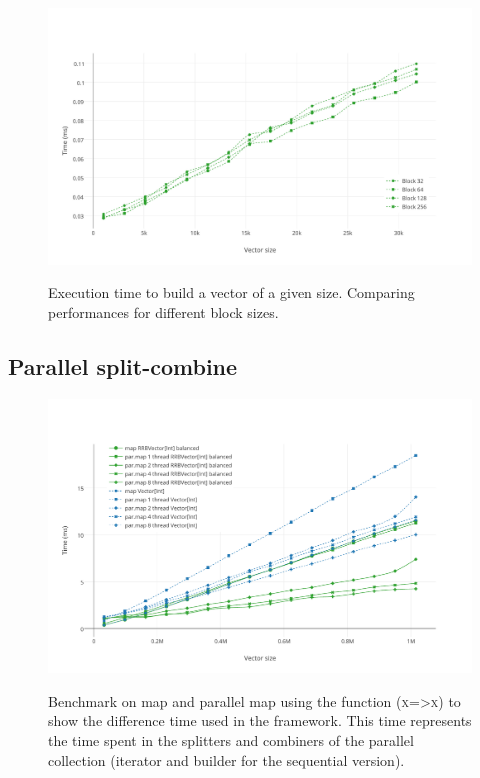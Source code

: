 \begin{figure}[h!]
  \centering
  \includegraphics[width=\textwidth]{Benchmarks/Builder_blocks.pdf}
  \label{BuilderBlocksBenchmarks}
  \caption{Execution time to build a vector of a given size. Comparing performances for different block sizes.}
\end{figure}

\subsection{Parallel split-combine}

\begin{figure}[h!]
  \centering
  \includegraphics[width=\textwidth]{Benchmarks/Parmap_balanced.pdf}
  \label{ParallelBenchmarks}
  \caption{Benchmark on map and parallel map using the function (\textsc{x=>x}) to show the difference time used in the framework. This time represents the time spent in the splitters and combiners of the parallel collection (iterator and builder for the sequential version).}
\end{figure}

